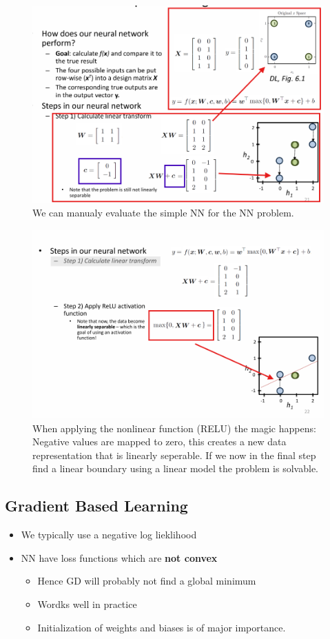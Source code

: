 \documentclass[../Main.tex]{subfiles}
\begin{document}
\begin{figure}[H]
    \centering
    \includegraphics[width=0.75\linewidth]{Images/xornnexample.png}
    \caption{We can manualy evaluate the simple NN for the NN problem.}
\end{figure}
\begin{figure}[H]
    \centering
    \includegraphics[width=0.75\linewidth]{Images/xornnexample-2.png}
    \caption{When applying the nonlinear function (RELU) the magic happens:
    Negative values are mapped to zero, this creates a new data representation that is linearly seperable.
    If we now in the final step find a linear boundary using a linear model the problem is solvable.}
\end{figure}

\subsection{Gradient Based Learning}
\begin{itemize}
    \item We typically use a negative log lieklihood
    \item NN have loss functions which are \textbf{not convex}
        \begin{itemize}
            \item Hence GD will probably not find a global minimum
            \item Wordks well in practice
            \item Initialization of weights and biases is of major importance.
        \end{itemize}
\end{itemize}
\end{document}
